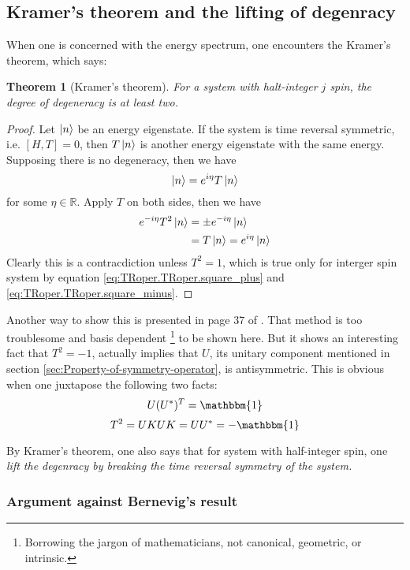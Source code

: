 \documentclass{article}
\numberwithin{equation}{subsection} %
\newtheorem{thm}{Theorem}[section]
\theoremstyle{definition}
\begin{document}
    \subsection{Kramer's theorem and the lifting of degenracy}
    \label{sec:Kramers-theorem-and-the-lifting-of-degenracy}
    When one is concerned with the energy spectrum, one encounters the
    Kramer's theorem, which says:
    \begin{thm}[Kramer's theorem]
        For a system with halt-integer $j$ spin, the degree of degeneracy
        is at least two.
    \end{thm}
    \begin{proof}
        Let $\ket{n}$ be an energy eigenstate. If the system is time
        reversal symmetric, i.e. $[H,T]=0$, then $T \ket{n}$ is
        another energy eigenstate with the same energy. Supposing there is
        no degeneracy, then we have
        $$ \ket{n} = e^{i\eta}T\ket{n}$$
        for some $\eta\in \mathbb{R}$. Apply $T$ on both sides, then
        we have
        \begin{align*}
            e^{-i\eta} T^2 \ket{n} &= \pm e^{-i\eta}\ket{n} \\
            &= T \ket{n} = e^{i\eta} \ket{n}
        \end{align*}
        Clearly this is a contracdiction unless $T^2=1$, which is
        true only for interger spin system by equation
        \ref{eq:TRoper.TRoper.square_plus} and
        \ref{eq:TRoper.TRoper.square_minus}.
    \end{proof}
    Another way to show this is presented in page 37 of
    \cite{bernevig}. That method is too troublesome and basis dependent 
    \footnote{Borrowing the jargon of mathematicians, not canonical,
        geometric, or intrinsic.}
    to be shown here.
    But it shows an interesting fact that $T^2=-1$, actually
    implies that $U$, its unitary component mentioned in section
    \ref{sec:Property-of-symmetry-operator}, is antisymmetric. This is
    obvious when one juxtapose the following two facts:
    $$ U (U^*)^T = \mathbbm{1}$$
    $$ T^2 = UKUK = U U^* = -\mathbbm{1} $$

    By Kramer's theorem, one also says that for system with half-integer
    spin, one \textit{lift the degenracy by breaking the time reversal
    symmetry of the system.}
    
        \subsubsection{Argument against Bernevig's result}
        \label{sec:Argument again Bernevig's result}
        
\end{document}
